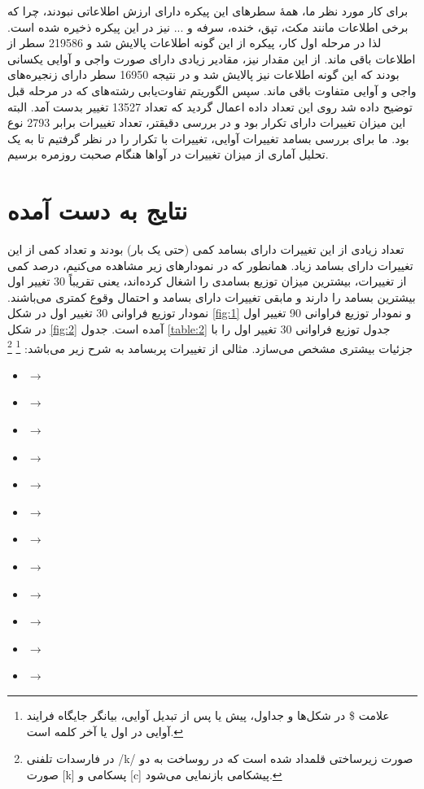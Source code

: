 \documentclass[12pt,onecolumn,a4paper]{article}
\begin{document}
    \par
    برای کار مورد نظر ما، همهٔ سطرهای این پیکره دارای ارزش اطلاعاتی نبودند، چرا که برخی اطلاعات مانند مکث، تپق، خنده، سرفه و ... نیز در این پیکره ذخیره شده است. لذا در مرحله اول کار، پیکره از این گونه اطلاعات پالایش شد و 219586 سطر از اطلاعات باقی ماند. از این مقدار نیز، مقادیر زیادی دارای صورت واجی و آوایی یکسانی بودند که این گونه اطلاعات نیز پالایش شد و در نتیجه 16950 سطر دارای زنجیره‌های واجی و آوایی متفاوت باقی ماند. سپس الگوریتم تفاوت‌یابی رشته‌های که در مرحله قبل توضیح داده شد روی این تعداد داده اعمال گردید که تعداد 13527 تغییر بدست آمد. البته این میزان تغییرات دارای تکرار بود و در بررسی دقیقتر، تعداد تغییرات برابر 2793 نوع بود. ما برای بررسی بسامد تغییرات آوایی، تغییرات با تکرار را در نظر گرفتیم تا به یک تحلیل آماری از میزان تغییرات در آواها هنگام صحبت روزمره برسیم.

    \section{نتایج به دست آمده}
    تعداد زیادی از این تغییرات دارای بسامد کمی (حتی یک بار) بودند و تعداد کمی از این تغییرات دارای بسامد زیاد. همانطور که در نمودارهای زیر مشاهده می‌کنیم، درصد کمی از تغییرات، بیشترین میزان توزیع بسامدی را اشغال کرده‌اند، یعنی تقریباً 30 تغییر اول بیشترین بسامد را دارند و مابقی تغییرات دارای بسامد و احتمال وقوع کمتری می‌باشند. نمودار توزیع فراوانی 30 تغییر اول در شکل \ref{fig:1} و نمودار توزیع فراوانی 90 تغییر اول در شکل \ref{fig:2} آمده است. جدول \ref{table:2} جدول توزیع فراوانی 30 تغییر اول را با جزئیات بیشتری مشخص می‌سازد. مثالی از تغییرات پربسامد به شرح زیر می‌باشد:
    \footnote{علامت \$ در شکل‌ها و جداول، پیش یا پس از تبدیل آوایی، بیانگر جایگاه فرایند آوایی در اول یا آخر کلمه است.}
    \footnote{در فارسدات تلفنی /k/ صورت زیرساختی قلمداد شده است که در روساخت به دو صورت [k] پسکامی و [c] پیشکامی بازنمایی می‌شود.}

    \begin{LTR}
        \begin{itemize}
            \item {} $\rightarrow$ 
            \item {} $\rightarrow$ 
            \item {} $\rightarrow$ 
            \item {} $\rightarrow$ 
            \item {} $\rightarrow$ 
            \item {} $\rightarrow$ 
            \item {} $\rightarrow$ 
            \item {} $\rightarrow$ 
            \item {} $\rightarrow$ 
            \item {} $\rightarrow$ 
            \item {} $\rightarrow$ 
            \item {} $\rightarrow$ 
        \end{itemize}
    \end{LTR}
\end{document}
